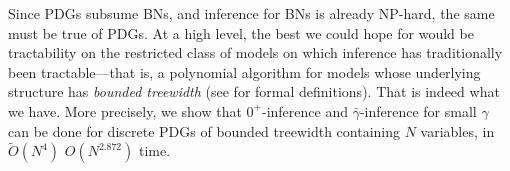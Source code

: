 \documentclass{article}
\newcommand\zogamma{{\bar\gamma}}
\newcommand\vjoe[1]{{\color{joecolor}\textbf{$\boldsymbol\{$Joe: }#1 \textbf{$\boldsymbol\}$}}}
\begin{document}
Since PDGs subsume BNs, and 
inference for BNs is already NP-hard, the same must be true of 
PDGs.
At a high level, the best we could hope for would be tractability on the restricted
class of models on which inference has traditionally been tractable---that is, a polynomial algorithm for models whose
underlying structure has \emph{bounded treewidth} (see
 for formal definitions).
That is indeed what we have.  
More precisely, we show that
$0^+$-inference
and $\zogamma$-inference for small $\gamma$ 
can be done for
discrete PDGs of bounded treewidth containing $N$ variables, in
$\tilde O(N^4)$ 
{\color{red}$O(N^{2.872})$}
time.
\end{document}
